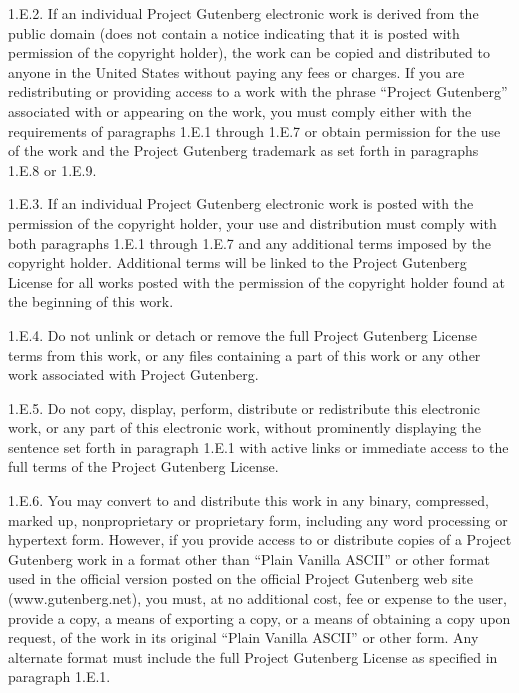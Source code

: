 1.E.2.  If an individual Project Gutenberg\texttrademark{} electronic work is derived
from the public domain (does not contain a notice indicating that it is
posted with permission of the copyright holder), the work can be copied
and distributed to anyone in the United States without paying any fees
or charges.  If you are redistributing or providing access to a work
with the phrase ``Project Gutenberg'' associated with or appearing on the
work, you must comply either with the requirements of paragraphs 1.E.1
through 1.E.7 or obtain permission for the use of the work and the
Project Gutenberg\texttrademark{} trademark as set forth in paragraphs 1.E.8 or
1.E.9.

1.E.3.  If an individual Project Gutenberg\texttrademark{} electronic work is posted
with the permission of the copyright holder, your use and distribution
must comply with both paragraphs 1.E.1 through 1.E.7 and any additional
terms imposed by the copyright holder.  Additional terms will be linked
to the Project Gutenberg\texttrademark{} License for all works posted with the
permission of the copyright holder found at the beginning of this work.

1.E.4.  Do not unlink or detach or remove the full Project Gutenberg\texttrademark{}
License terms from this work, or any files containing a part of this
work or any other work associated with Project Gutenberg\texttrademark{}.

1.E.5.  Do not copy, display, perform, distribute or redistribute this
electronic work, or any part of this electronic work, without
prominently displaying the sentence set forth in paragraph 1.E.1 with
active links or immediate access to the full terms of the Project
Gutenberg\texttrademark{} License.

1.E.6.  You may convert to and distribute this work in any binary,
compressed, marked up, nonproprietary or proprietary form, including any
word processing or hypertext form.  However, if you provide access to or
distribute copies of a Project Gutenberg\texttrademark{} work in a format other than
``Plain Vanilla ASCII'' or other format used in the official version
posted on the official Project Gutenberg\texttrademark{} web site (www.gutenberg.net),
you must, at no additional cost, fee or expense to the user, provide a
copy, a means of exporting a copy, or a means of obtaining a copy upon
request, of the work in its original ``Plain Vanilla ASCII'' or other
form.  Any alternate format must include the full Project Gutenberg\texttrademark{}
License as specified in paragraph 1.E.1.

